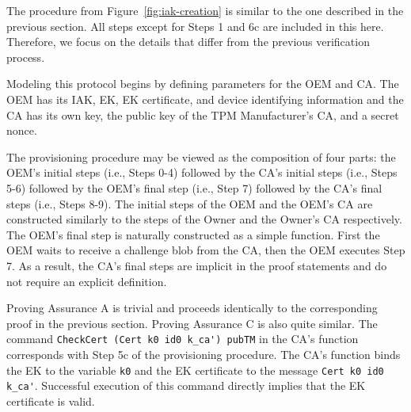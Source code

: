 \documentclass[runningheads]{llncs}
\begin{document}
The procedure from Figure~\ref{fig:iak-creation} is similar to the one
described in the previous section. All steps except for Steps 1 and 6c
are included in this here. Therefore, we focus on the details that
differ from the previous verification process.

Modeling this protocol begins by defining parameters for the OEM and
CA. The OEM has its IAK, EK, EK certificate, and device identifying
information and the CA has its own key, the public key of the TPM
Manufacturer's CA, and a secret nonce.



The provisioning procedure may be viewed as the composition of four
parts: the OEM's initial steps (i.e., Steps 0-4) followed by the CA's
initial steps (i.e., Steps 5-6) followed by the OEM's final step
(i.e., Step 7) followed by the CA's final steps (i.e., Steps 8-9). The
initial steps of the OEM and the OEM's CA are constructed similarly to
the steps of the Owner and the Owner's CA respectively.  The OEM's
final step is naturally constructed as a simple function. First the
OEM waits to receive a challenge blob from the CA, then the OEM
executes Step 7. As a result, the CA's final steps are implicit in the
proof statements and do not require an explicit definition.

Proving Assurance A is trivial and proceeds identically to the
corresponding proof in the previous section. Proving Assurance C is
also quite similar. The command
\verb|CheckCert (Cert k0 id0 k_ca') pubTM| in the CA's function
corresponds with Step 5c of the provisioning procedure. The CA's
function binds the EK to the variable \verb|k0| and the EK certificate
to the message \verb|Cert k0 id0 k_ca'|.  Successful execution of this
command directly implies that the EK certificate is valid.
\end{document}
